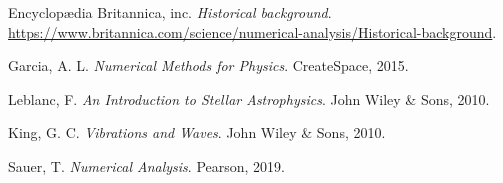 \documentclass[11pt]{article}
\begin{document}
\begin{thebibliography}{99}  %

  Encyclopædia Britannica, inc.
  \newblock \emph{Historical background}.
  \newblock \url{https://www.britannica.com/science/numerical-analysis/Historical-background}.
  
  Garcia, A. L.
  \newblock \emph{Numerical Methods for Physics}.
  \newblock CreateSpace, 2015.
  
  Leblanc, F.
  \newblock \emph{An Introduction to Stellar Astrophysics}.
  \newblock John Wiley \& Sons, 2010.
  
  King, G. C.
  \newblock \emph{Vibrations and Waves}.
  \newblock John Wiley \& Sons, 2010.
  
  Sauer, T.
  \newblock \emph{Numerical Analysis}.
  \newblock Pearson, 2019.
  
\end{thebibliography}
\end{document}
